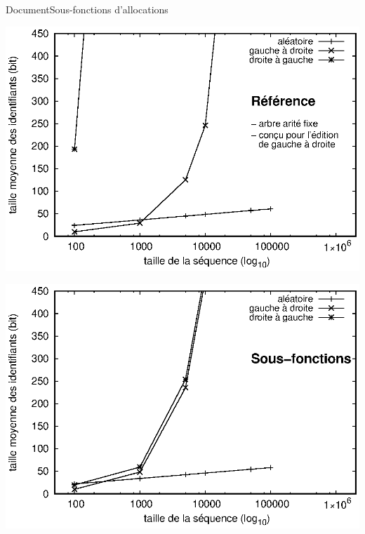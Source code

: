 \begin{frame}{Document}{Sous-fonctions d'allocations}
  \vspace{0.43cm}\hspace{-1cm}
  \begin{minipage}{0.45\textwidth}
    \includegraphics[width=1.25\textwidth]{img/replication/logoot.eps}
  \end{minipage}
  \hspace{1.5cm}
  \begin{minipage}{0.45\textwidth}
    \includegraphics[width=1.25\textwidth]{img/replication/robin.eps}
  \end{minipage}

\end{frame}


